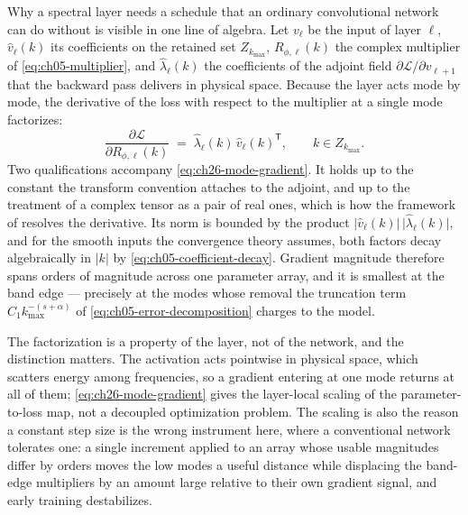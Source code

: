 Why a spectral layer needs a schedule that an ordinary convolutional network can do
without is visible in one line of algebra. Let $v_\ell$ be the input of layer $\ell$,
$\hat{v}_\ell(k)$ its coefficients on the retained set $Z_{k_{\max}}$,
$R_{\phi,\ell}(k)$ the complex multiplier of \eqref{eq:ch05-multiplier}, and
$\hat{\lambda}_\ell(k)$ the coefficients of the adjoint field
$\partial\mathcal{L}/\partial v_{\ell+1}$ that the backward pass delivers in physical
space. Because the layer acts mode by mode, the derivative of the loss with respect to the
multiplier at a single mode factorizes:
\begin{equation}
  \label{eq:ch26-mode-gradient}
  \frac{\partial \mathcal{L}}{\partial R_{\phi,\ell}(k)} \;=\; \hat{\lambda}_\ell(k)\, \hat{v}_\ell(k)^{\mathsf{T}}, \qquad k \in Z_{k_{\max}}.
\end{equation}
Two qualifications accompany \eqref{eq:ch26-mode-gradient}. It holds up to the constant the
transform convention attaches to the adjoint, and up to the treatment of a complex tensor as
a pair of real ones, which is how the framework of \cite{paszke2019pytorch} resolves the
derivative. Its norm is bounded by the product $\lvert\hat{v}_\ell(k)\rvert\,
\lvert\hat{\lambda}_\ell(k)\rvert$, and for the smooth inputs the convergence theory
assumes, both factors decay algebraically in $\lvert k\rvert$ by
\eqref{eq:ch05-coefficient-decay}. Gradient magnitude therefore spans orders of magnitude
across one parameter array, and it is smallest at the band edge --- precisely at the modes
whose removal the truncation term $C_1 k_{\max}^{-(s+\alpha)}$ of
\eqref{eq:ch05-error-decomposition} charges to the model.

The factorization is a property of the layer, not of the network, and the distinction
matters. The activation acts pointwise in physical space, which scatters energy among
frequencies, so a gradient entering at one mode returns at all of them;
\eqref{eq:ch26-mode-gradient} gives the layer-local scaling of the parameter-to-loss map,
not a decoupled optimization problem. The scaling is also the reason a constant step size is
the wrong instrument here, where a conventional network tolerates one: a single increment
applied to an array whose usable magnitudes differ by orders moves the low modes a useful
distance while displacing the band-edge multipliers by an amount large relative to their own
gradient signal, and early training destabilizes. 

